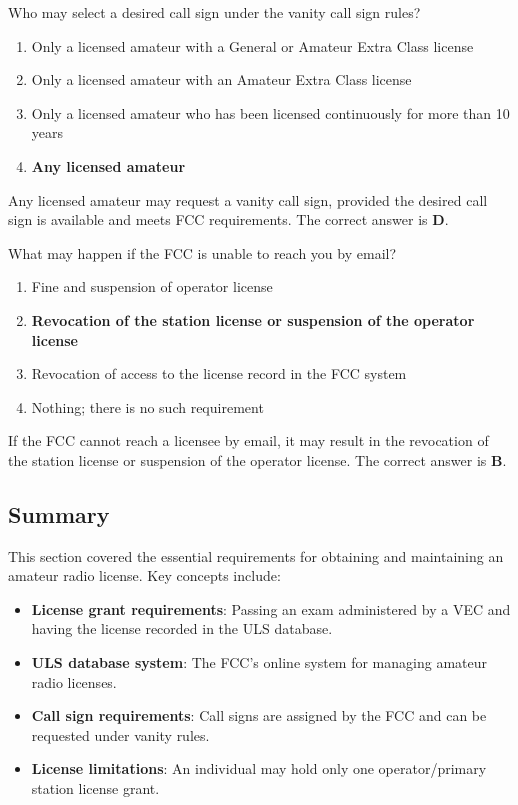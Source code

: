 
\begin{tcolorbox}[colback=gray!10!white,colframe=black!75!black,title={T1C02}]
    Who may select a desired call sign under the vanity call sign rules?
    \begin{enumerate}[label=\Alph*),noitemsep]
        \item Only a licensed amateur with a General or Amateur Extra Class license
        \item Only a licensed amateur with an Amateur Extra Class license
        \item Only a licensed amateur who has been licensed continuously for more than 10 years
        \item \textbf{Any licensed amateur}
    \end{enumerate}
\end{tcolorbox}
Any licensed amateur may request a vanity call sign, provided the desired call sign is available and meets FCC requirements. The correct answer is \textbf{D}.


\begin{tcolorbox}[colback=gray!10!white,colframe=black!75!black,title={T1C04}]
    What may happen if the FCC is unable to reach you by email?
    \begin{enumerate}[label=\Alph*),noitemsep]
        \item Fine and suspension of operator license
        \item \textbf{Revocation of the station license or suspension of the operator license}
        \item Revocation of access to the license record in the FCC system
        \item Nothing; there is no such requirement
    \end{enumerate}
\end{tcolorbox}
If the FCC cannot reach a licensee by email, it may result in the revocation of the station license or suspension of the operator license. The correct answer is \textbf{B}.


\subsection*{Summary}
This section covered the essential requirements for obtaining and maintaining an amateur radio license. Key concepts include:

\begin{itemize}
    \item \textbf{License grant requirements}: Passing an exam administered by a VEC and having the license recorded in the ULS database.
    \item \textbf{ULS database system}: The FCC's online system for managing amateur radio licenses.
    \item \textbf{Call sign requirements}: Call signs are assigned by the FCC and can be requested under vanity rules.
    \item \textbf{License limitations}: An individual may hold only one operator/primary station license grant.
\end{itemize}
